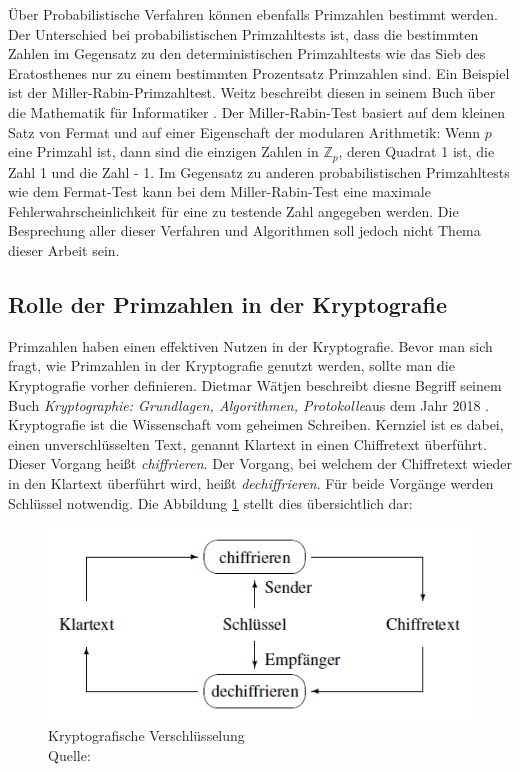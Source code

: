 Über Probabilistische Verfahren können ebenfalls Primzahlen bestimmt werden. Der Unterschied bei probabilistischen Primzahltests ist, dass die bestimmten Zahlen im Gegensatz zu den deterministischen Primzahltests wie das Sieb des Eratosthenes nur zu einem bestimmten Prozentsatz Primzahlen sind. Ein Beispiel ist der Miller-Rabin-Primzahltest. Weitz beschreibt diesen in seinem Buch über die Mathematik für Informatiker \cite[S. 97]{WEITZ.2021}. Der Miller-Rabin-Test basiert auf dem kleinen Satz von Fermat und auf einer Eigenschaft der modularen Arithmetik: Wenn $p$ eine Primzahl ist, dann sind die einzigen Zahlen in $\mathbb{Z}_p$, deren Quadrat 1 ist, die Zahl 1 und die Zahl - 1. Im Gegensatz zu anderen probabilistischen Primzahltests wie dem Fermat-Test kann bei dem Miller-Rabin-Test eine maximale Fehlerwahrscheinlichkeit für eine zu testende Zahl angegeben werden. Die Besprechung aller dieser Verfahren und Algorithmen soll jedoch nicht Thema dieser Arbeit sein.

\subsection{Rolle der Primzahlen in der Kryptografie}
Primzahlen haben einen effektiven Nutzen in der Kryptografie. Bevor man sich fragt, wie Primzahlen in der Kryptografie genutzt werden, sollte man die Kryptografie vorher definieren. Dietmar Wätjen beschreibt diesne Begriff seinem Buch \glqq\textit{Kryptographie: Grundlagen, Algorithmen, Protokolle}\grqq aus dem Jahr 2018 \cite[S. 1]{Watjen.2018}. Kryptografie ist die Wissenschaft vom geheimen Schreiben. Kernziel ist es dabei, einen unverschlüsselten Text, genannt Klartext in einen Chiffretext überführt. Dieser Vorgang heißt \textit{chiffrieren}. Der Vorgang, bei welchem der Chiffretext wieder in den Klartext überführt wird, heißt \textit{dechiffrieren}. Für beide Vorgänge werden Schlüssel notwendig. Die Abbildung \ref{fig:verschluesselung} stellt dies übersichtlich dar:

\begin{figure}[!h]
    \centering
    \includegraphics[width=\textwidth]{grafiken/verschluesselung.png}
    \caption[Kryptografische Verschlüsselung]{Kryptografische Verschlüsselung \\ Quelle: \cite[S. 1]{Watjen.2018}}
    \label{fig:verschluesselung}
\end{figure}

